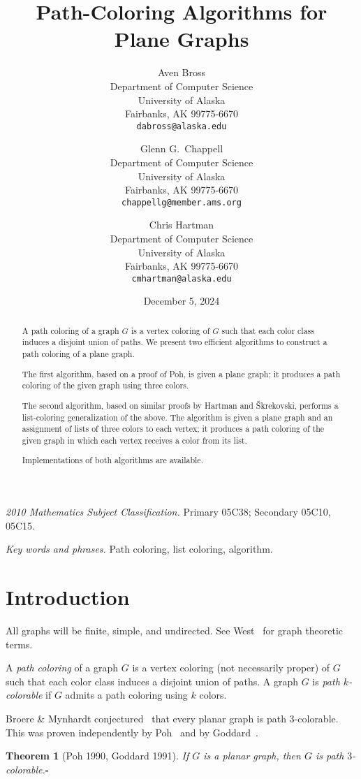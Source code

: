 \documentclass[12pt,letterpaper]{article}
\date{December 5, 2024}
\title{Path-Coloring Algorithms for Plane Graphs}
\author{Aven Bross\\
\small Department of Computer Science\\
\small University of Alaska\\
\small Fairbanks, AK 99775-6670\\
\small\texttt{dabross@alaska.edu} \and
Glenn G.~Chappell\\
\small Department of Computer Science\\
\small University of Alaska\\
\small Fairbanks, AK 99775-6670\\
\small\texttt{chappellg{@}member.ams.org} \and
Chris Hartman\\
\small Department of Computer Science\\
\small University of Alaska\\
\small Fairbanks, AK 99775-6670\\
\small\texttt{cmhartman{@}alaska.edu}}
\theoremstyle{plain}
\newtheorem{theorem}[lemma]{Theorem}         %
\theoremstyle{definition}
\theoremstyle{break}
\newcommand{\ggcqedsymbol}{$\square$}
\newcommand{\ggcqed}{\hbox{}\nobreak\hbox{\quad\ggcqedsymbol}}
\newcommand{\ggcnopf}{\ggcqed}
\newcommand{\defterm}[1]{\emph{#1}} %
\newcommand{\abstdefterm}[1]{#1} %
\begin{document}
\maketitle
\centerline{\small \textit{2010 Mathematics Subject Classification.}
 Primary 05C38; Secondary 05C10, 05C15.}
\centerline{\small \textit{Key words and phrases.}
 Path coloring, list coloring, algorithm.}

\begin{abstract}
A \abstdefterm{path coloring} of a graph $G$ is a vertex coloring
of $G$ such that each color class induces a disjoint union of paths.
We present two efficient algorithms
to construct a path coloring of a plane graph.

The first algorithm, based on a proof of Poh, %
is given a plane graph;
it produces a path coloring of the given graph
using three colors.

The second algorithm,
based on similar proofs
by Hartman %
and \v{S}krekovski, %
performs a list-coloring generalization of the above.
The algorithm is given a plane graph and an assignment of lists of
three colors to each vertex;
it produces a path coloring of the given graph
in which each vertex receives a color from its list.

Implementations of both algorithms are available.
\end{abstract}


\section{Introduction}

All graphs will be finite, simple, and undirected.
See West~\cite{Wes2000} for graph theoretic terms.

A \defterm{path coloring} of a graph $G$ is a vertex coloring
(not necessarily proper) of $G$ such that each color class induces
a disjoint union of paths.
A graph $G$ is \defterm{path $k$-colorable} if $G$
admits a path coloring using $k$ colors.

Broere \& Mynhardt conjectured~\cite[Conj.~16]{BrMy1985}
that every planar graph is path $3$-colorable.
This was proven independently by Poh~\cite[Thm.~2]{Poh1990}
and by Goddard~\cite[Thm.~1]{God1991}.

\begin{theorem}[Poh 1990, Goddard 1991]\label{T:planar3c}
If $G$ is a planar graph,
then $G$ is path $3$-colorable.\ggcnopf\end{theorem}
\end{document}
